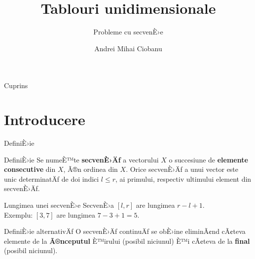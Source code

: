 \documentclass{beamer}
\title{Tablouri unidimensionale}
\subtitle{Probleme cu secvenÈ›e}
\author{Andrei Mihai Ciobanu}
\institute{Algolymp Summer School}
\date{}
\begin{document}
\begin{frame}
  \titlepage
\end{frame}

\begin{frame}{Cuprins}
  \tableofcontents[hideallsubsections]
\end{frame}

\section{Introducere}

\begin{frame}[shrink]{DefiniÈ›ie}
  \begin{block}{DefiniÈ›ie}
    Se numeÈ™te \textbf{secvenÈ›Äƒ} a vectorului $X$ o succesiune de
    \textbf{elemente consecutive} din $X$, Ã®n ordinea din $X$. Orice secvenÈ›Äƒ a unui vector este unic determinatÄƒ de doi indici $l \leq r$, ai primului, respectiv ultimului element din secvenÈ›Äƒ.
  \end{block}
  \begin{block}{Lungimea unei secvenÈ›e}
    SecvenÈ›a $[l, r]$ are lungimea $r - l + 1$.\\
    Exemplu: $[3, 7]$ are lungimea $7 - 3 + 1 = 5$.
  \end{block}
  \begin{block}{DefiniÈ›ie alternativÄƒ}
    O secvenÈ›Äƒ continuÄƒ se obÈ›ine eliminÃ¢nd cÃ¢teva elemente de la \textbf{Ã®nceputul} È™irului
    (posibil niciunul) È™i cÃ¢teva de la \textbf{final} (posibil niciunul).
  \end{block}
\end{frame}
\end{document}
